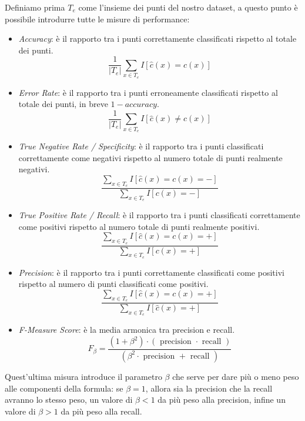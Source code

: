 Definiamo prima $T_e$ come l'insieme dei punti del nostro dataset, a questo punto è possibile introdurre tutte le misure di performance:
\begin{itemize}
\item \textit{Accuracy}: è il rapporto tra i punti correttamente classificati rispetto al totale dei punti.
\[\frac{1}{|T_e|} \sum_{x \in T_e} I[\hat{c}(x)=c(x)]\]
\item \textit{Error Rate}: è il rapporto tra i punti erroneamente classificati rispetto al totale dei punti, in breve \(1-accuracy\).
\[\frac{1}{|T_e|} \sum_{x \in T_e} I[\hat{c}(x)\neq c(x)]\]
\item \textit{True Negative Rate / Specificity}: è il rapporto tra i punti classificati correttamente come negativi rispetto al numero totale di punti realmente negativi.
\[\frac{\sum_{x \in T_e} I[\hat{c}(x)=c(x)=-]}{\sum_{x \in T_e} I[c(x)=-]}\]
\item \textit{True Positive Rate / Recall}: è il rapporto tra i punti classificati correttamente come positivi rispetto al numero totale di punti realmente positivi.
\[\frac{\sum_{x \in T_e} I[\hat{c}(x)=c(x)=+]}{\sum_{x \in T_e} I[c(x)=+]}\]
\item \textit{Precision}: è il rapporto tra i punti correttamente classificati come positivi rispetto al numero di punti classificati come positivi.
\[\frac{\sum_{x \in T_e} I[\hat{c}(x)=c(x)=+]}{\sum_{x \in T_e} I[\hat{c}(x)=+]}\]
\item \textit{F-Measure Score}: è la media armonica tra precision e recall.
\[F_\beta=\frac{\left(1+\beta^2\right) \cdot(\text { precision } \cdot \text { recall })}{\left(\beta^2 \cdot \text { precision }+\text { recall }\right)}\]
\end{itemize}
Quest'ultima misura introduce il parametro $\beta$ che serve per dare più o meno peso alle componenti della formula: se $\beta = 1$, allora sia la precision che la recall avranno lo stesso peso, un valore di $\beta < 1$ da più peso alla precision, infine un valore di $\beta > 1$ da più peso alla recall.

